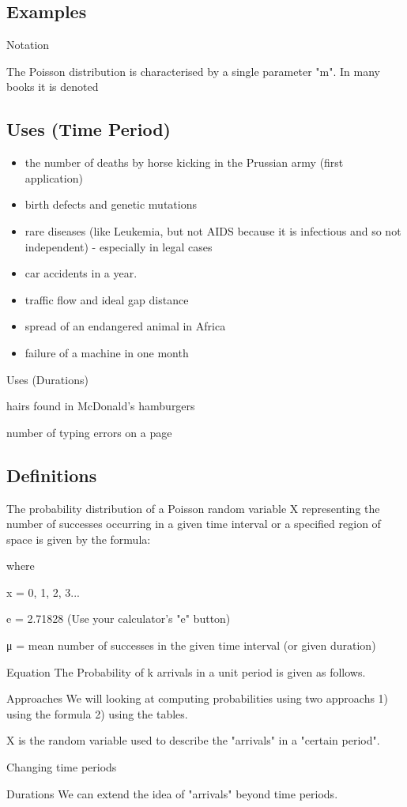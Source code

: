 \documentclass[a4paper,12pt]{article}
\begin{document}
\subsection*{Examples}

Notation 

The Poisson distribution is characterised by a single parameter "m".
In many books it is denoted 


\subsection{Uses (Time Period)}
\begin{itemize}
\item the number of deaths by horse kicking in the Prussian army (first application)
\item birth defects and genetic mutations
\item rare diseases (like Leukemia, but not AIDS because it is infectious and so not independent) - especially in legal cases
\item car accidents in a year.
\item traffic flow and ideal gap distance
\item spread of an endangered animal in Africa
\item failure of a machine in one month
\end{itemize}

Uses (Durations)

hairs found in McDonald's hamburgers

number of typing errors on a page

\subsection{Definitions}

The probability distribution of a Poisson random variable X representing the number of successes occurring in a given time interval or a specified region of space is given by the formula:

where

x = 0, 1, 2, 3...

e = 2.71828 (Use your calculator's "e" button)

μ = mean number of successes in the given time interval (or given duration)

Equation 
The Probability of k arrivals in a unit period is given as follows.


Approaches
We will looking at computing probabilities using two approachs
1) using the formula
2) using the tables.

X is the random variable used to describe the "arrivals" in a "certain period".


Changing time periods


Durations
We can extend the idea of "arrivals" beyond time periods.

\end{document}
